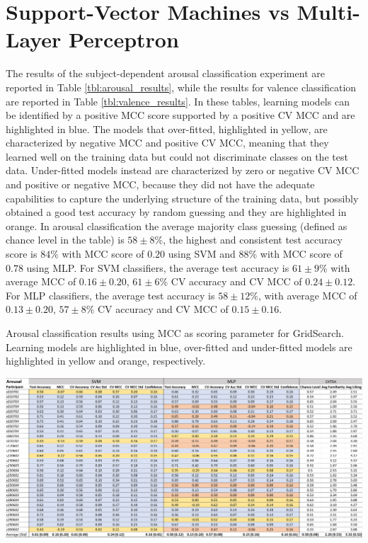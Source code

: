 \section{Support-Vector Machines vs Multi-Layer Perceptron}
\label{sec:svm_mlp}
The results of the subject-dependent arousal classification experiment are reported in Table \ref{tbl:arousal_results}, while the results for valence classification are reported in Table \ref{tbl:valence_results}. In these tables, learning models can be identified by a positive \ac{MCC} score supported by a positive \ac{CV MCC} and are highlighted in blue. The models that over-fitted, highlighted in yellow, are characterized by negative \ac{MCC} and positive \ac{CV MCC}, meaning that they learned well on the training data but could not discriminate classes on the test data. Under-fitted models instead are characterized by zero or negative \ac{CV MCC} and positive or negative \ac{MCC}, because they did not have the adequate capabilities to capture the underlying structure of the training data, but possibly obtained a good test accuracy by random guessing and they are highlighted in orange.  In arousal classification the average majority class guessing (defined as chance level in the table) is \(58\pm8\%\), the highest and consistent test accuracy score is \(84\%\) with \ac{MCC} score of \(0.20\) using \ac{SVM} and \(88\%\) with \ac{MCC} score of \(0.78\) using \ac{MLP}. For \ac{SVM} classifiers, the average test accuracy is \( 61\pm9\%\) with average MCC of \(0.16\pm0.20\), \(61\pm6\% \) \ac{CV} accuracy and \ac{CV MCC} of \(0.24\pm0.12\). For \ac{MLP} classifiers, the average test accuracy is \(58\pm12\%\), with average MCC of \(0.13\pm0.20\), \(57\pm8\% \) \ac{CV} accuracy and \ac{CV MCC} of \(0.15\pm0.16\). 

\begin{table}[h!]
  \caption{Arousal classification results using MCC as scoring parameter for GridSearch. Learning models are highlighted in blue, over-fitted and under-fitted models are highlighted in yellow and orange, respectively.}
  \label{tbl:arousal_results}
  \includegraphics[width=\linewidth]{img/results/arousal_results.png}
\end{table}

